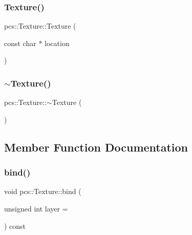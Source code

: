 \subsubsection{\texorpdfstring{Texture()}{Texture()}\hspace{0.1cm}{\footnotesize\ttfamily [2/2]}}
{\footnotesize\ttfamily pcs\+::\+Texture\+::\+Texture (\begin{DoxyParamCaption}\item[{const char $\ast$}]{location }\end{DoxyParamCaption})}

\mbox{\label{classpcs_1_1Texture_a2267bb7d920e784a1915ae14e5b5916b}} 
\subsubsection{\texorpdfstring{$\sim$\+Texture()}{~Texture()}}
{\footnotesize\ttfamily pcs\+::\+Texture\+::$\sim$\+Texture (\begin{DoxyParamCaption}{ }\end{DoxyParamCaption})}



\subsection{Member Function Documentation}
\mbox{\label{classpcs_1_1Texture_a7c9becc6a694a55489bdc2b62c4aea2a}} 
\subsubsection{\texorpdfstring{bind()}{bind()}}
{\footnotesize\ttfamily void pcs\+::\+Texture\+::bind (\begin{DoxyParamCaption}\item[{unsigned int}]{layer = {} }\end{DoxyParamCaption}) const}

\mbox{\label{classpcs_1_1Texture_aad31d75ae69be153300bd87e244afa54}} 
